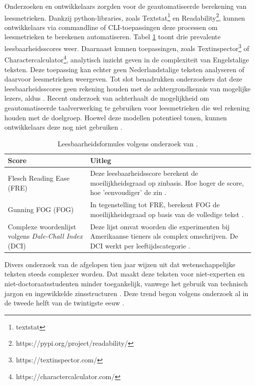 Onderzoeken en ontwikkelaars zorgden voor de geautomatiseerde berekening van leesmetrieken. Dankzij python-libraries, zoals Textstat\footnote{textstat} en Readability\footnote{https://pypi.org/project/readability/}, kunnen ontwikkelaars via commandline of CLI-toepassingen deze processen om leesmetrieken te berekenen automatiseren. Tabel \ref{table:readability-scores} toont drie prevalente leesbaarheidsscores weer. Daarnaast kunnen toepassingen, zoals Textinspector\footnote{https://textinspector.com/} of Charactercalculator\footnote{https://charactercalculator.com/}, analytisch inzicht geven in de complexiteit van Engelstalige teksten. Deze toepassing kan echter geen Nederlandstalige teksten analyseren of daarvoor leesmetrieken weergeven. Tot slot benadrukken onderzoekers dat deze leesbaarheidsscores geen rekening houden met de achtergrondkennis van mogelijke lezers, aldus \autocite{Cantos2019}. Recent onderzoek van \textcite{Crossley2019} achterhaalt de mogelijkheid om geautomatiseerde taalverwerking te gebruiken voor leesmetrieken die wel rekening houden met de doelgroep. Hoewel deze modellen potentieel tonen, kunnen ontwikkelaars deze nog niet gebruiken \autocite{Crossley2019}.

\begin{center}
	\begin{table}[H]
	\begin{tabular}{ | m{5cm} | m{10cm} | } 
		\hline
		\textbf{Score} & \textbf{Uitleg} \\ 
		\hline
		Flesch Reading Ease (FRE) & Deze leesbaarheidsscore berekent de moeilijkheidsgraad op zinbasis. Hoe hoger de score, hoe 'eenvoudiger' de zin \textcite{Cantos2019, Readable2021}. \\
		\hline
		Gunning FOG (FOG) & In tegenstelling tot FRE, berekent FOG de moeilijkheidsgraad op basis van de volledige tekst \autocite{Cantos2019}. \\
		\hline
		Complexe woordenlijst volgens \textit{Dale-Chall Index} (DCI) & Deze lijst omvat woorden die experimenten bij Amerikaanse tieners als complex omschrijven. De DCI werkt per leeftijdscategorie \autocite{Cantos2019}. \\
		\hline
	\end{tabular}
	\caption{Leesbaarheidsformules volgens onderzoek van \textcite{Cantos2019}.}
	\label{table:readability-scores}
	\end{table}
\end{center}

Divers onderzoek van de afgelopen tien jaar wijzen uit dat wetenschappelijke teksten steeds complexer worden. Dat maakt deze teksten voor niet-experten en niet-doctoraatsstudenten minder toegankelijk, vanwege het gebruik van technisch jargon en ingewikkelde zinsstructuren \autocite{Ball2017, PlavenSigray2017, Jones2019}. Deze trend begon volgens onderzoek al in de tweede helft van de twintigste eeuw \autocite{Hayes1992}.

